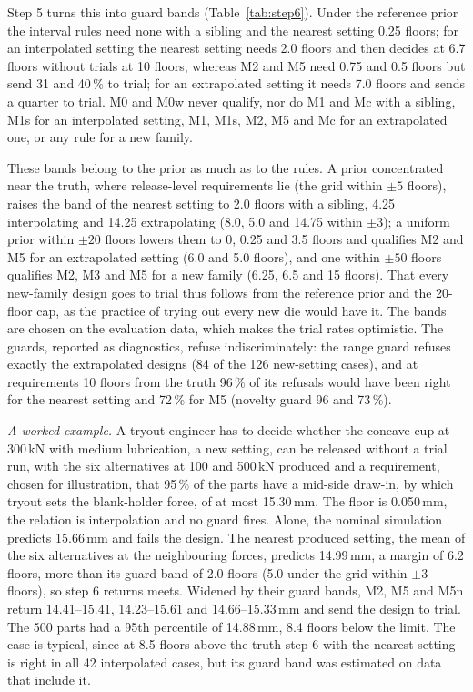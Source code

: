 \documentclass[pdflatex,sn-basic,lineno]{sn-jnl}
\begin{document}
Step 5 turns this into guard bands (Table~\ref{tab:step6}). Under the reference prior the interval rules need none with a sibling and the nearest setting 0.25 floors; for an interpolated setting the nearest setting needs 2.0 floors and then decides at 6.7 floors without trials at 10 floors, whereas M2 and M5 need 0.75 and 0.5 floors but send 31 and 40\,\% to trial; for an extrapolated setting it needs 7.0 floors and sends a quarter to trial. M0 and M0w never qualify, nor do M1 and Mc with a sibling, M1s for an interpolated setting, M1, M1s, M2, M5 and Mc for an extrapolated one, or any rule for a new family.

These bands belong to the prior as much as to the rules. A prior concentrated near the truth, where release-level requirements lie (the grid within $\pm5$ floors), raises the band of the nearest setting to 2.0 floors with a sibling, 4.25 interpolating and 14.25 extrapolating (8.0, 5.0 and 14.75 within $\pm3$); a uniform prior within $\pm20$ floors lowers them to 0, 0.25 and 3.5 floors and qualifies M2 and M5 for an extrapolated setting (6.0 and 5.0 floors), and one within $\pm50$ floors qualifies M2, M3 and M5 for a new family (6.25, 6.5 and 15 floors). That every new-family design goes to trial thus follows from the reference prior and the 20-floor cap, as the practice of trying out every new die would have it. The bands are chosen on the evaluation data, which makes the trial rates optimistic. The guards, reported as diagnostics, refuse indiscriminately: the range guard refuses exactly the extrapolated designs (84 of the 126 new-setting cases), and at requirements 10 floors from the truth 96\,\% of its refusals would have been right for the nearest setting and 72\,\% for M5 (novelty guard 96 and 73\,\%).

\emph{A worked example.} A tryout engineer has to decide whether the concave cup at 300\,kN with medium lubrication, a new setting, can be released without a trial run, with the six alternatives at 100 and 500\,kN produced and a requirement, chosen for illustration, that 95\,\% of the parts have a mid-side draw-in, by which tryout sets the blank-holder force, of at most 15.30\,mm. The floor is 0.050\,mm, the relation is interpolation and no guard fires. Alone, the nominal simulation predicts 15.66\,mm and fails the design. The nearest produced setting, the mean of the six alternatives at the neighbouring forces, predicts 14.99\,mm, a margin of 6.2 floors, more than its guard band of 2.0 floors (5.0 under the grid within $\pm3$ floors), so step 6 returns meets. Widened by their guard bands, M2, M5 and M5n return 14.41--15.41, 14.23--15.61 and 14.66--15.33\,mm and send the design to trial. The 500 parts had a 95th percentile of 14.88\,mm, 8.4 floors below the limit. The case is typical, since at 8.5 floors above the truth step 6 with the nearest setting is right in all 42 interpolated cases, but its guard band was estimated on data that include it.
\end{document}

